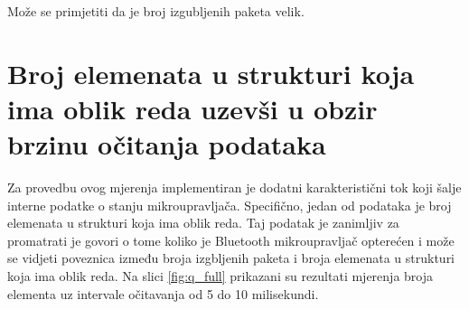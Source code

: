 \documentclass[times, utf8, diplomski]{diplomski}
\begin{document}
Može se primjetiti da je broj izgubljenih paketa velik.

\section{Broj elemenata u strukturi koja ima oblik reda uzevši u obzir brzinu očitanja podataka}

Za provedbu ovog mjerenja implementiran je dodatni karakteristični tok koji šalje interne podatke o stanju mikroupravljača.
Specifično, jedan od podataka je broj elemenata u strukturi koja ima oblik reda.
Taj podatak je zanimljiv za promatrati je govori o tome koliko je Bluetooth mikroupravljač opterećen i može se vidjeti poveznica između broja izgbljenih paketa i broja elemenata u strukturi koja ima oblik reda.
Na slici \ref{fig:q_full} prikazani su rezultati mjerenja broja elementa uz intervale očitavanja od 5 do 10 milisekundi.
\end{document}
